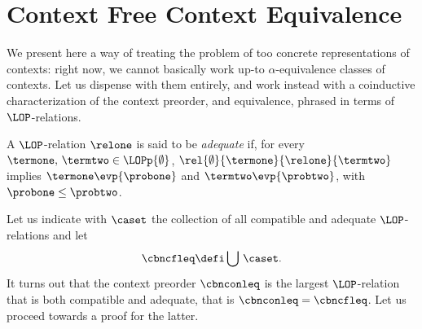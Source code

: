 \section{Context Free Context Equivalence}\label{sec:cfctxeq}


We present here a way of treating the problem of too concrete
representations of contexts: right now, we cannot basically work up-to
$\alpha$-equivalence classes of contexts. Let us dispense with them
entirely, and work instead with a coinductive characterization of the
context preorder, and equivalence, phrased in terms of $\LOP$-relations.

\begin{definition}\label{def:adequateCBN}
  A $\LOP$-relation $\relone$ is said to be \textit{adequate} if, for every
  $\termone,\,\termtwo\in\LOPp{\emptyset}$,
  $\rel{\emptyset}{\termone}{\relone}{\termtwo}$ implies
  $\termone\evp{\probone}$ and $\termtwo\evp{\probtwo}$, with
  $\probone\leq\probtwo$.
\end{definition}
Let us indicate with $\caset$ the collection of all compatible and adequate
$\LOP$-relations and let
\begin{equation}
  \label{eq:cfctxCBN}
  \cbncfleq \defi \bigcup\,\caset.
\end{equation}
It turns out that the context preorder $\cbnconleq$ is the largest
$\LOP$-relation that is both compatible and adequate, that is $\cbnconleq =
\cbncfleq$. Let us proceed towards a proof for the latter.

